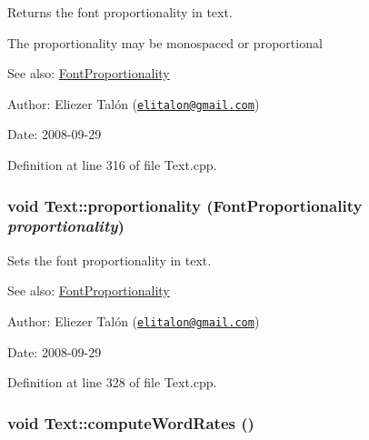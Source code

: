 Returns the font proportionality in text. 

The proportionality may be monospaced or proportional

\begin{Desc}
\item[See also:]\hyperlink{_font_proportionality_8h_a9aa255df24db58a9b4cbc46941f2ac1}{FontProportionality}\end{Desc}
\begin{Desc}
\item[Author:]Eliezer Talón (\href{mailto:elitalon@gmail.com}{\tt elitalon@gmail.com}) \end{Desc}
\begin{Desc}
\item[Date:]2008-09-29 \end{Desc}


Definition at line 316 of file Text.cpp.\hypertarget{class_text_90ebca7fe222314f1c50c4e36559ca64}{
\subsubsection[proportionality]{\setlength{\rightskip}{0pt plus 5cm}void Text::proportionality ({\bf FontProportionality} {\em proportionality})}}
\label{class_text_90ebca7fe222314f1c50c4e36559ca64}


Sets the font proportionality in text. 

\begin{Desc}
\item[See also:]\hyperlink{_font_proportionality_8h_a9aa255df24db58a9b4cbc46941f2ac1}{FontProportionality}\end{Desc}
\begin{Desc}
\item[Author:]Eliezer Talón (\href{mailto:elitalon@gmail.com}{\tt elitalon@gmail.com}) \end{Desc}
\begin{Desc}
\item[Date:]2008-09-29 \end{Desc}


Definition at line 328 of file Text.cpp.\hypertarget{class_text_8239e13039bcc1c713f66f1236693706}{
\subsubsection[computeWordRates]{\setlength{\rightskip}{0pt plus 5cm}void Text::computeWordRates ()}}
\label{class_text_8239e13039bcc1c713f66f1236693706}


